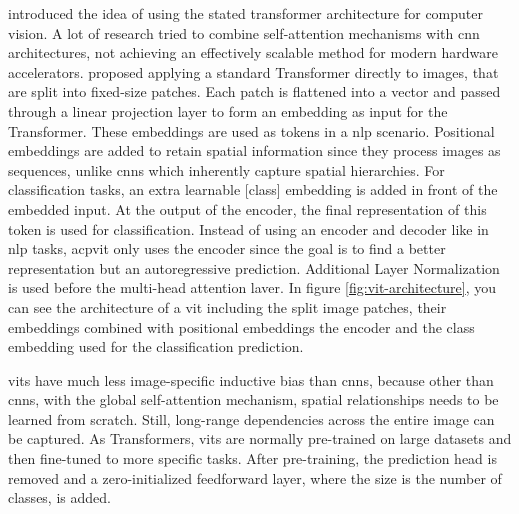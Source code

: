 \documentclass[conference]{IEEEtran}
\begin{document}
  \citeauthor{visiontransformers2021} introduced the idea of using the stated transformer architecture for computer vision. A lot of research tried to combine self-attention mechanisms with \ac{cnn} architectures, not achieving an effectively scalable method for modern hardware accelerators. \cite{visiontransformers2021} proposed applying a standard Transformer directly to images, that are split into fixed-size patches. Each patch is flattened into a vector and passed through a linear projection layer to form an embedding as input for the Transformer. These embeddings are used as tokens in a \ac{nlp} scenario. Positional embeddings are added to retain spatial information since they process images as sequences, unlike \acp{cnn} which inherently capture spatial hierarchies. For classification tasks, an extra learnable [class] embedding is added in front of the embedded input. At the output of the encoder, the final representation of this token is used for classification. Instead of using an encoder and decoder like in \ac{nlp} tasks, acp{vit} only uses the encoder since the goal is to find a better representation but an autoregressive prediction. Additional Layer Normalization is used before the multi-head attention laver. \cite{vit-state-challenges} In figure \ref{fig:vit-architecture}, you can see the architecture of a \ac{vit} including the split image patches, their embeddings combined with positional embeddings the encoder and the class embedding used for the classification prediction.

  \acp{vit} have much less image-specific inductive bias than \acp{cnn}, because other than \acp{cnn}, with the global self-attention mechanism, spatial relationships needs to be learned from scratch. Still, long-range dependencies across the entire image can be captured.  As Transformers, \acp{vit} are normally pre-trained on large datasets and then fine-tuned to more specific tasks. After pre-training, the prediction head is removed and a zero-initialized feedforward layer, where the size is the number of classes, is added.
\end{document}
